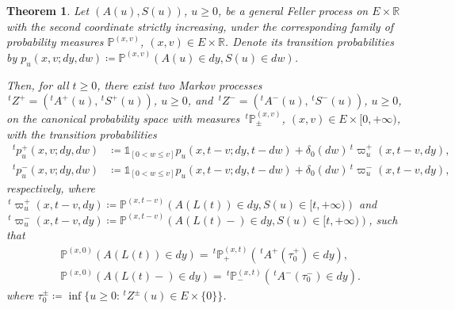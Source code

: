 \documentclass[reqno]{amsart}
\newtheorem{theorem}{Theorem}[section] %
\theoremstyle{remark}
\numberwithin{equation}{section} %
\newcommand{\RR}{\mathbb{R}}
\newcommand{\PP}{\mathds{P}}
\newcommand{\1}{\mathds{1}}
\begin{document}
	\begin{theorem}\label{theorem_harmoniv}
		Let $(A(u), S(u))$, $u \geq 0$, be a general Feller process on $E \times \RR$ with the second coordinate strictly increasing, under the corresponding family of probability measures $\mathds{P}^{(x,v)}$, $(x,v)\in E\times \RR$. Denote its transition probabilities by $p_{u}(x,v;dy,dw)\coloneqq \PP^{(x,v)}(A(u)\in dy, S(u) \in dw) $.
		
		Then, for all $t\ge0$, there exist two Markov processes $\,^tZ^+=(^tA^+(u), \,^tS^+(u))$, $u\geq 0$, and $\,^tZ^-=(^tA^-(u), \,^tS^-(u))$, $u \geq 0$, on the canonical probability space with measures $\,^t\mathds{P}_\pm^{(x,v)}$, $(x,v)\in E\times [0,+\infty)$, with the transition probabilities 
		\begin{align*}
			\, ^t{p}_{u}^+(x,v;dy,dw) &\coloneqq \mathds{1}_{[0<w\leq v]}  p_{u}(x,t-v;dy,t-dw)+
			\delta_0(dw)\,^t\upvarpi_u^+(x,t-v,dy), \\
			\,^tp_{u}^-(x,v;dy,dw) &\coloneqq \mathds{1}_{[0<w\leq v]}  p_{u}(x,t-v;dy,t-dw)+\delta_0(dw)\,^t\upvarpi_u^-(x,t-v,dy),
		\end{align*}
		respectively, where $\,^t\upvarpi_u^+(x,t-v,dy)\coloneqq \mathds{P}^{(x,t-v)}\left( A(L(t))\in dy, S(u)\in[t,+\infty)\right)$ and $\,^t\upvarpi_u^-(x,t-v,dy)\coloneqq \mathds{P}^{(x,t-v)}\left( A(L(t)-)\in dy, 
		S(u)\in[t,+\infty)\right)$, such that 
		\begin{align}
			& \mathds{P}^{(x,0)} \left( A(L(t)) \in dy \right) =  \,^t\mathds{P}_+^{(x,t)} \left( \,^tA^+(\tau_0^+) \in dy \right), \label{317}\\
			& \mathds{P}^{(x,0)} \left( A(L(t)-) \in dy \right) =  \,^t\mathds{P}_-^{(x,t)} \left( \,^tA^-(\tau_0^-) \in dy \right). \label{318}
		\end{align}
		where $\tau^{\pm}_0 \coloneqq \inf \{ u \geq 0 : \,^tZ^{\pm}(u) \in E \times \{ 0 \} \}$.
	\end{theorem}
\end{document}
